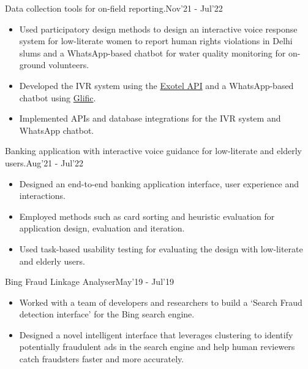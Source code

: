 
\begin{projects}

\projectb
	{Data collection tools for on-field reporting.}{Nov'21 - Jul'22}{}
	{\begin{itemize}
	\setlength\itemsep{0.3em}
     \item Used participatory design methods to design an interactive voice response system for low-literate women to report human rights violations in Delhi slums and a WhatsApp-based chatbot for water quality monitoring for on-ground volunteers.
     \item Developed the IVR system using the \href{https://developer.exotel.com/}{Exotel API} and a WhatsApp-based chatbot using \href{https://github.com/glific}{Glific}.
     \item Implemented APIs and database integrations for the IVR system and WhatsApp chatbot.
     \end{itemize}}

\projectb
	{Banking application with interactive voice guidance for low-literate and elderly users.}{Aug'21 - Jul'22}{}
		{\begin{itemize}
		\setlength\itemsep{0.3em}
     \item Designed an end-to-end banking application interface, user experience and interactions.
     \item Employed methods such as card sorting and heuristic evaluation for application design, evaluation and iteration.
     \item Used task-based usability testing for evaluating the design with low-literate and elderly users.
     \end{itemize}}

\projectb
    {Bing Fraud Linkage Analyser}{May'19 - Jul'19}{}
		{\begin{itemize}
		\setlength\itemsep{0.3em}
     \item Worked with a team of developers and researchers to build a ‘Search Fraud detection interface’ for the Bing search engine.
    \item Designed a novel intelligent interface that leverages clustering to identify potentially fraudulent ads in the search engine and help human reviewers catch fraudsters faster and more accurately.
     \end{itemize}}

\end{projects}
\vspace{-3mm}
